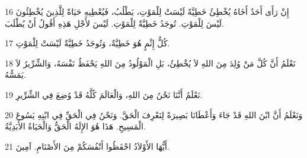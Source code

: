 \par 16 إِنْ رَأَى أَحَدٌ أَخَاهُ يُخْطِئُ خَطِيَّةً لَيْسَتْ لِلْمَوْتِ، يَطْلُبُ، فَيُعْطِيهِ حَيَاةً لِلَّذِينَ يُخْطِئُونَ لَيْسَ لِلْمَوْتِ. تُوجَدُ خَطِيَّةٌ لِلْمَوْتِ. لَيْسَ لأَجْلِ هَذِهِ أَقُولُ أَنْ يُطْلَبَ.
\par 17 كُلُّ إِثْمٍ هُوَ خَطِيَّةٌ، وَتُوجَدُ خَطِيَّةٌ لَيْسَتْ لِلْمَوْتِ.
\par 18 نَعْلَمُ أَنَّ كُلَّ مَنْ وُلِدَ مِنَ اللهِ لاَ يُخْطِئُ، بَلِ الْمَوْلُودُ مِنَ اللهِ يَحْفَظُ نَفْسَهُ، وَالشِّرِّيرُ لاَ يَمَسُّهُ.
\par 19 نَعْلَمُ أَنَّنَا نَحْنُ مِنَ اللهِ، وَالْعَالَمَ كُلَّهُ قَدْ وُضِعَ فِي الشِّرِّيرِ.
\par 20 وَنَعْلَمُ أَنَّ ابْنَ اللهِ قَدْ جَاءَ وَأَعْطَانَا بَصِيرَةً لِنَعْرِفَ الْحَقَّ. وَنَحْنُ فِي الْحَقِّ فِي ابْنِهِ يَسُوعَ الْمَسِيحِ. هَذَا هُوَ الإِلَهُ الْحَقُّ وَالْحَيَاةُ الأَبَدِيَّةُ.
\par 21 أَيُّهَا الأَوْلاَدُ احْفَظُوا أَنْفُسَكُمْ مِنَ الأَصْنَامِ. آمِينَ.


